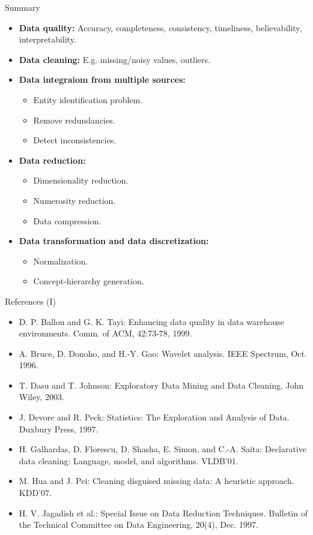 \documentclass[aspectratio=169,t]{beamer}
\begin{document}
  {
    \begin{frame}{Summary}
      \begin{itemize}
        \item \textbf{Data quality:} Accuracy, completeness, consistency, timeliness, believability, interpretability.
        \item \textbf{Data cleaning:} E.g. missing/noisy values, outliers.
        \item \textbf{Data integraiom from multiple sources:}
        \begin{itemize}
          \item Entity identification problem.
          \item Remove redundancies.
          \item Detect inconsistencies.
        \end{itemize}
        \item \textbf{Data reduction:}
        \begin{itemize}
          \item Dimensionality reduction.
          \item Numerosity reduction.
          \item Data compression.
        \end{itemize}
        \item \textbf{Data transformation and data discretization:}
        \begin{itemize}
          \item Normalization.
          \item Concept-hierarchy generation.
        \end{itemize}
      \end{itemize}
    \end{frame}
  }


  {
    \begin{frame}{References (I)}
      \begin{itemize}
        \item D. P. Ballou and G. K. Tayi: Enhancing data quality in data warehouse environments. Comm. of ACM, 42:73-78, 1999.
        \item A. Bruce, D. Donoho, and H.-Y. Gao: Wavelet analysis. IEEE Spectrum, Oct. 1996.
        \item {\color{airforceblue}T. Dasu and T. Johnson:  Exploratory Data Mining and Data Cleaning. John Wiley, 2003.}
        \item J. Devore and R. Peck: Statistics: The Exploration and Analysis of Data. Duxbury Press, 1997.
        \item H. Galhardas, D. Florescu, D. Shasha, E. Simon, and C.-A. Saita: Declarative data cleaning: Language, model, and algorithms. VLDB'01.
        \item M. Hua and J. Pei: Cleaning disguised missing data: A heuristic approach. KDD'07.
        \item {\color{airforceblue}H. V. Jagadish et al.: Special Issue on Data Reduction Techniques.  Bulletin of the Technical Committee on Data Engineering, 20(4), Dec. 1997.}
      \end{itemize}
    \end{frame}
  }
\end{document}
